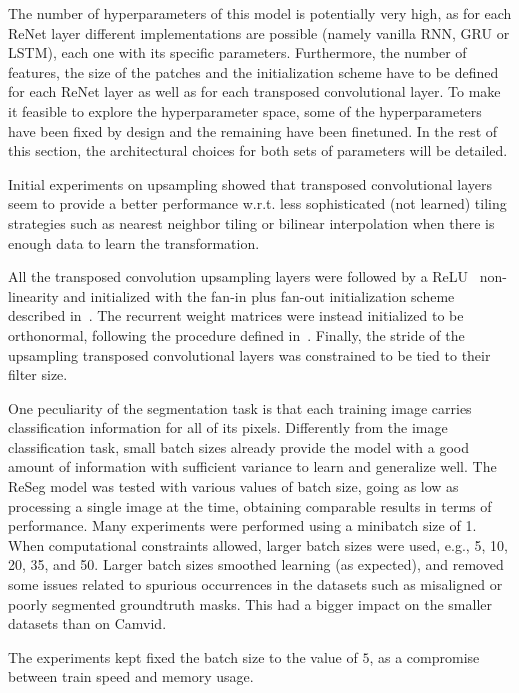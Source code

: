 The number of hyperparameters of this model is potentially very high, as for
each ReNet layer different implementations are possible (namely vanilla RNN,
GRU or LSTM), each one with its specific parameters. Furthermore, the number of
features, the size of the patches and the initialization scheme have to be
defined for each ReNet layer as well as for each transposed convolutional
layer. To make it feasible to explore the hyperparameter space, some of the
hyperparameters have been fixed by design and the remaining have been
finetuned.
In the rest of this section, the architectural choices for both
sets of parameters will be detailed.

Initial experiments on upsampling showed that transposed convolutional layers
seem to provide a better performance w.r.t. less sophisticated (not learned)
tiling strategies such as nearest neighbor tiling or bilinear interpolation
when there is enough data to learn the transformation.

All the transposed convolution upsampling layers were followed by a
ReLU~\cite{Krizhevsky2012-alexnet} non-linearity and initialized with the
fan-in plus fan-out initialization scheme described
in~\cite{glorot2010understanding}. The recurrent weight matrices were instead
initialized to be orthonormal, following the procedure defined
in~\cite{Saxe2014}. Finally, the stride of the upsampling transposed
convolutional layers was constrained to be tied to their filter size.

One peculiarity of the segmentation task is that each training image carries
classification information for all of its pixels. Differently from the image
classification task, small batch sizes already provide the model with a good
amount of information with sufficient variance to learn and generalize well.
The ReSeg model was tested with various values of batch size, going as low as
processing a single image at the time, obtaining comparable results in terms of
performance. Many experiments were performed using a minibatch size of 1. When
computational constraints allowed, larger batch sizes were used, e.g., 5, 10,
20, 35, and 50. Larger batch sizes smoothed learning (as expected), and removed
some issues related to spurious occurrences in the datasets such as misaligned
or poorly segmented groundtruth masks. This had a bigger impact on the smaller
datasets than on Camvid.

The experiments kept fixed the batch size to the value of $5$, as
a compromise between train speed and memory usage.

